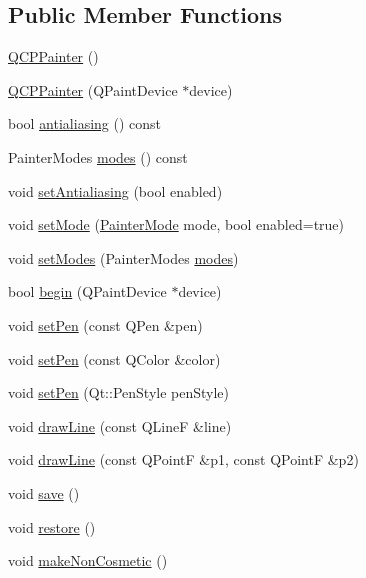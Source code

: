 \subsection*{Public Member Functions}
\begin{DoxyCompactItemize}
\item 
\hyperlink{class_q_c_p_painter_a3c52cb0f43f34573d29bea487da28fe8}{Q\+C\+P\+Painter} ()
\item 
\hyperlink{class_q_c_p_painter_ae58dbb1795ddc4351ab324dc9898aa22}{Q\+C\+P\+Painter} (Q\+Paint\+Device $\ast$device)
\item 
bool \hyperlink{class_q_c_p_painter_a5aff96296e995f6f35b2596a482aae37}{antialiasing} () const
\item 
Painter\+Modes \hyperlink{class_q_c_p_painter_aef102658219b24165f7ee2aad1b9e48f}{modes} () const
\item 
void \hyperlink{class_q_c_p_painter_aaba1deb9188244d9ea65b035112b4d05}{set\+Antialiasing} (bool enabled)
\item 
void \hyperlink{class_q_c_p_painter_af6b1f7d2bbc548b10aa55d8b6ad49577}{set\+Mode} (\hyperlink{class_q_c_p_painter_a156cf16444ff5e0d81a73c615fdb156d}{Painter\+Mode} mode, bool enabled=true)
\item 
void \hyperlink{class_q_c_p_painter_a5fac93adc29c7c4dea9f3e171e9e635e}{set\+Modes} (Painter\+Modes \hyperlink{class_q_c_p_painter_aef102658219b24165f7ee2aad1b9e48f}{modes})
\item 
bool \hyperlink{class_q_c_p_painter_a0a41146ccd619dceab6e25ec7b46b044}{begin} (Q\+Paint\+Device $\ast$device)
\item 
void \hyperlink{class_q_c_p_painter_af9c7a4cd1791403901f8c5b82a150195}{set\+Pen} (const Q\+Pen \&pen)
\item 
void \hyperlink{class_q_c_p_painter_a5c4d88f21564e156e88ef807f7cf0003}{set\+Pen} (const Q\+Color \&color)
\item 
void \hyperlink{class_q_c_p_painter_a25e76095aae41da0d08035060e5f81ca}{set\+Pen} (Qt\+::\+Pen\+Style pen\+Style)
\item 
void \hyperlink{class_q_c_p_painter_a0b4b1b9bd495e182c731774dc800e6e0}{draw\+Line} (const Q\+LineF \&line)
\item 
void \hyperlink{class_q_c_p_painter_ad1638db27929491b3f1beb74d6cbad5e}{draw\+Line} (const Q\+PointF \&p1, const Q\+PointF \&p2)
\item 
void \hyperlink{class_q_c_p_painter_a8fd6821ee6fecbfa04444c9062912abd}{save} ()
\item 
void \hyperlink{class_q_c_p_painter_a64908e6298d5bbd83457dc987cc3a022}{restore} ()
\item 
void \hyperlink{class_q_c_p_painter_a7e63fbcf47e35c6f2ecd11b8fef7c7d8}{make\+Non\+Cosmetic} ()
\end{DoxyCompactItemize}
